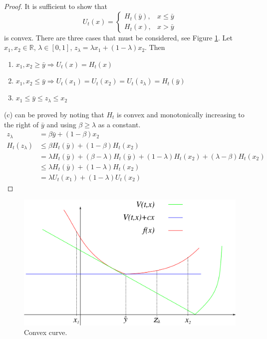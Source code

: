 \documentclass[lecture,12pt,]{pcms-l}
\theoremstyle{example}
\begin{document}
\begin{proof}
It is sufficient to show that
$$U_t(x) = \begin{cases} H_t(\bar{y}), & x\leq\bar{y} \\ H_t(x), & x>\bar{y} \end{cases}$$
is convex. There are three cases that must be considered, see Figure \ref{fig:06curve}. Let $x_1,x_2\in\mathbb{R}$, $\lambda\in[0,1]$, $z_\lambda = \lambda x_1 + (1-\lambda)x_2$. Then
\begin{enumerate}
\item $x_1,x_2\geq\bar{y} \Rightarrow U_t(x) = H_t(x)$
\item $x_1,x_2\leq\bar{y} \Rightarrow U_t(x_1) = U_t(x_2) = U_t(z_\lambda) = H_t(\bar{y})$
\item $x_1\leq\bar{y}\leq z_\lambda\leq x_2$
\end{enumerate}
(c) can be proved by noting that $H_t$ is convex and monotonically increasing to the right of $\bar{y}$ and using $\beta\geq\lambda$ as a constant.
\begin{align*}
z_\lambda &= \beta\bar{y} + (1-\beta)x_2 \\
H_t(z_\lambda) &\leq \beta H_t(\bar{y})+(1-\beta)H_t(x_2) \\
&= \lambda H_t(\bar{y})+(\beta-\lambda)H_t(\bar{y}) + (1-\lambda)H_t(x_2) + (\lambda-\beta)H_t(x_2) \\
&\leq \lambda H_t(\bar{y}) + (1-\lambda)H_t(x_2) \\
&= \lambda U_t(x_1) + (1-\lambda)U_t(x_2)
\end{align*}
\end{proof}

\begin{figure}[ht!]
	\centering
	\includegraphics[width=.5\textwidth]{images/06curve}
	\caption{Convex curve.}
	\label{fig:06curve}
\end{figure}
\end{document}
